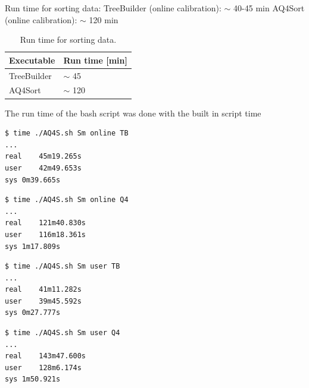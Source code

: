 \documentclass[twoside,english]{uiofysmaster/uiofysmaster}
\begin{document}
Run time for sorting data: \newline
TreeBuilder (online calibration): $\sim$ 40-45 min \newline
AQ4Sort (online calibration): $\sim$ 120 min

\begin{table}[H] 
\centering 
\caption{Run time for sorting data.}
\label{tab:run_time}
\begin{tabular}{ll}
\hline
Executable & Run time [min] \\
\hline
TreeBuilder & $\sim$ 45 \\
AQ4Sort & $\sim$ 120 \\
\hline
\end{tabular}
\end{table}

The run time of the bash script was done with the built in script time

\begin{lstlisting}[language=sh]
$ time ./AQ4S.sh Sm online TB
...
real	45m19.265s
user	42m49.653s
sys	0m39.665s
\end{lstlisting}


\begin{lstlisting}[language=sh]
$ time ./AQ4S.sh Sm online Q4
...
real	121m40.830s
user	116m18.361s
sys	1m17.809s
\end{lstlisting}


\begin{lstlisting}[language=sh]
$ time ./AQ4S.sh Sm user TB
...
real	41m11.282s
user	39m45.592s
sys	0m27.777s
\end{lstlisting}


\begin{lstlisting}[language=sh]
$ time ./AQ4S.sh Sm user Q4
...
real	143m47.600s
user	128m6.174s
sys	1m50.921s
\end{lstlisting}

\bigskip
\end{document}

